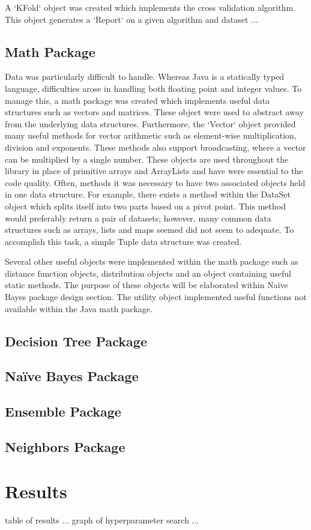 \documentclass[11pt]{article}
\begin{document}
A `KFold` object was created which implements the cross validation algorithm. This object generates a `Report` on a given algorithm and dataset ...

\subsection{Math Package}
Data was particularly difficult to handle. Whereas Java is a statically typed language, difficulties arose in handling both floating point and integer values. To manage this, a math package was created which implements useful data structures such as vectors and matrices. These object were used to abstract away from the underlying data structures. Furthermore, the `Vector` object provided many useful methods for vector arithmetic such as element-wise multiplication, division and exponents. These methods also support broadcasting, where a vector can be multiplied by a single number. These objects are used throughout the library in place of primitive arrays and ArrayLists and have were essential to the code quality. Often, methods it was necessary to have two associated objects held in one data structure. For example, there exists a method within the DataSet object which splits itself into two parts based on a pivot point. This method would preferably return a pair of datasets; however, many common data structures such as arrays, lists and maps seemed did not seem to adequate. To accomplish this task, a simple Tuple data structure was created.

Several other useful objects were implemented within the math package such as distance function objects, distribution objects and an object containing useful static methods. The purpose of these objects will be elaborated within Naïve Bayes package design section. The utility object implemented useful functions not available within the Java math package.

\subsection{Decision Tree Package}


\subsection{Naïve Bayes Package}
\subsection{Ensemble Package}
\subsection{Neighbors Package}

\section{Results}
table of results ...
graph of hyperparameter search ...



\end{document}
